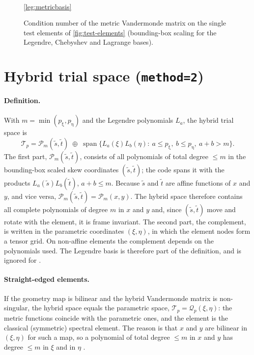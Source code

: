 \begin{figure}[htbp]
\\[4pt]
  \ref{leg:metricbasis}
  \caption{Condition number of the metric Vandermonde matrix on the single test
    elements of \cref{fig:test-elements} (bounding-box scaling for the Legendre,
    Chebyshev and Lagrange bases).}
  \label{fig:metric-basis-kappa}
\end{figure}

\section{Hybrid trial space (\texttt{method=2})}
\label{sec:metric-hybrid}

\paragraph{Definition.} With $m=\min(p_\upxi,p_\upeta)$ and the Legendre
polynomials $L_a$, the hybrid trial space is
\begin{equation}
  \mathcal T_p = \mathcal P_m(\tilde s,\tilde t)\;\oplus\;\operatorname{span}\{L_a(\xi)L_b(\eta):\
  a\le p_\upxi,\ b\le p_\upeta,\ a+b>m\}.
  \label{eq:hybrid-space}
\end{equation}
The first part, $\mathcal P_m(\tilde s,\tilde t)$, consists of all polynomials of total
degree $\le m$ in the bounding-box scaled skew coordinates $(\tilde s,\tilde t)$;
the code spans it with the products $L_a(\tilde s)L_b(\tilde t)$, $a+b\le m$.
Because $\tilde s$ and $\tilde t$ are affine functions of $x$ and $y$, and vice
versa, $\mathcal P_m(\tilde s,\tilde t)=\mathcal P_m(x,y)$. The hybrid space therefore
contains all complete polynomials of degree $m$ in $x$ and $y$ and, since
$(\tilde s,\tilde t)$ move and rotate with the element, it is frame invariant. The
second part, the complement, is written in the parametric coordinates $(\xi,\eta)$,
in which the element nodes form a tensor grid. On non-affine elements the complement
depends on the polynomials used. The Legendre basis is therefore part of the
definition, and \code{p.metricBasis} is ignored for \code{method=2}.

\paragraph{Straight-edged elements.} If the geometry map is bilinear and the
hybrid Vandermonde matrix is non-singular, the hybrid space equals the
parametric space, $\mathcal T_p=\mathcal Q_p(\xi,\eta)$: the metric functions coincide with the
parametric ones, and the element is the classical (symmetric) spectral element.
The reason is that $x$ and $y$ are bilinear in $(\xi,\eta)$ for such a map, so a
polynomial of total degree $\le m$ in $x$ and $y$ has degree $\le m$ in $\xi$ and
in $\eta$ \parencite[cf.][]{Arnold2002Approximation}.

